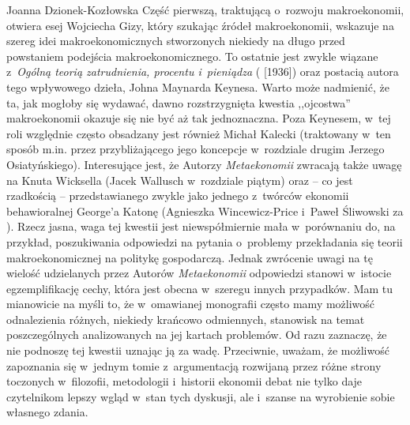 \begin{recplenv}{Joanna Dzionek-Kozłowska}
Część pierwszą, traktującą o~rozwoju makroekonomii, otwiera esej Wojciecha Gizy, który szukając źródeł makroekonomii,
wskazuje na szereg idei makroekonomicznych stworzonych niekiedy na długo przed powstaniem podejścia makroekonomicznego.
To ostatnie jest zwykle wiązane z~\textit{Ogólną teorią zatrudnienia, procentu i~pieniądza}
(\cite{keynes_ogolna_2003} [1936])
oraz postacią autora tego wpływowego dzieła, Johna
Maynarda Keynesa. Warto może nadmienić, że ta, jak mogłoby się wydawać, dawno rozstrzygnięta kwestia ,,ojcostwa''
makroekonomii okazuje się nie być aż tak jednoznaczna. Poza Keynesem, w~tej roli względnie często obsadzany jest również
Michał Kalecki (traktowany w~ten sposób m.in. przez przybliżającego jego koncepcje w~rozdziale drugim Jerzego
Osiatyńskiego). Interesujące jest, że Autorzy \textit{Metaekonomii} zwracają także uwagę na Knuta Wicksella (Jacek
Wallusch w~rozdziale piątym) oraz -- co jest rzadkością -- przedstawianego zwykle jako jednego z~twórców ekonomii
behawioralnej George'a Katonę (Agnieszka Wincewicz-Price i~Paweł Śliwowski za
\parencite{colander_complexity_2014}).
Rzecz jasna, waga tej kwestii jest niewspółmiernie mała w~porównaniu do, na przykład, poszukiwania
odpowiedzi na pytania o~problemy przekładania się teorii makroekonomicznej na politykę gospodarczą. Jednak zwrócenie
uwagi na tę wielość udzielanych przez Autorów \textit{Metaekonomii} odpowiedzi stanowi w~istocie egzemplifikację cechy,
która jest obecna w~szeregu innych przypadków. Mam tu mianowicie na myśli to, że w~omawianej monografii często mamy
możliwość odnalezienia różnych, niekiedy krańcowo odmiennych, stanowisk na temat poszczególnych analizowanych na jej
kartach problemów. Od razu zaznaczę, że nie podnoszę tej kwestii uznając ją za wadę. Przeciwnie, uważam, że możliwość
zapoznania się w~jednym tomie z~argumentacją rozwijaną przez różne strony toczonych w~filozofii, metodologii i~historii
ekonomii debat nie tylko daje czytelnikom lepszy wgląd w~stan tych dyskusji, ale i~szanse na wyrobienie sobie własnego
zdania.


\end{recplenv}
